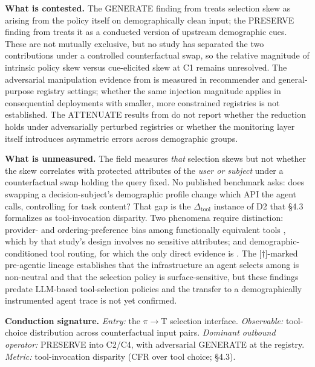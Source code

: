 \documentclass[acmsmall,nonacm]{acmart}
\begin{document}
\textbf{What is contested.} The GENERATE finding from \cite{blankenstein2025biasbusters} treats selection skew as arising from the policy itself on demographically clean input; the PRESERVE finding from \cite{xu2026ducx} treats it as a conducted version of upstream demographic cues. These are not mutually exclusive, but no study has separated the two contributions under a controlled counterfactual swap, so the relative magnitude of intrinsic policy skew versus cue-elicited skew at C1 remains unresolved. The adversarial manipulation evidence from \cite{sneh2025tooltweak,tang2026your} is measured in recommender and general-purpose registry settings; whether the same injection magnitude applies in consequential deployments with smaller, more constrained registries is not established. The ATTENUATE results from \cite{singh2025bias,singh2025biasb} do not report whether the reduction holds under adversarially perturbed registries or whether the monitoring layer itself introduces asymmetric errors across demographic groups.

\textbf{What is unmeasured.} The field measures \emph{that} selection skews but not whether the skew correlates with protected attributes of the \emph{user or subject} under a counterfactual swap holding the query fixed. No published benchmark asks: does swapping a decision-subject's demographic profile change which API the agent calls, controlling for task content? That gap is the $\Delta_{\mathrm{tool}}$ instance of D2 that \S{}4.3 formalizes as tool-invocation disparity. Two phenomena require distinction: provider- and ordering-preference bias among functionally equivalent tools \cite{blankenstein2025biasbusters}, which by that study's design involves no sensitive attributes; and demographic-conditioned tool routing, for which the only direct evidence is \cite{xu2026ducx}. The [$\dagger$]-marked pre-agentic lineage \cite{u2018algorithms,makhortykh2021detecting,pezeshkpour2023large} establishes that the infrastructure an agent selects among is non-neutral and that the selection policy is surface-sensitive, but these findings predate LLM-based tool-selection policies and the transfer to a demographically instrumented agent trace is not yet confirmed.

\textbf{Conduction signature.} \emph{Entry:} the $\pi$$\rightarrow$T selection interface. \emph{Observable:} tool-choice distribution across counterfactual input pairs. \emph{Dominant outbound operator:} PRESERVE into C2/C4, with adversarial GENERATE at the registry. \emph{Metric:} tool-invocation disparity (CFR over tool choice; \S{}4.3).
\end{document}
